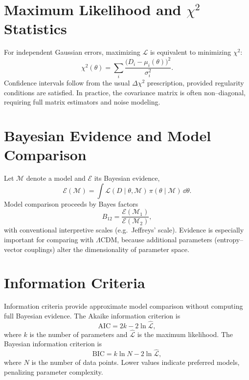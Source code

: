 \section{Maximum Likelihood and $\chi^2$ Statistics}

For independent Gaussian errors, maximizing $\mathcal L$ is equivalent
to minimizing $\chi^2$:
\begin{equation}
\chi^2(\theta) = \sum_i \frac{\bigl(D_i -
\mu_i(\theta)\bigr)^2}{\sigma_i^2}.
\end{equation}
Confidence intervals follow from the usual $\Delta\chi^2$ prescription,
provided regularity conditions are satisfied.  In practice, the
covariance matrix is often non--diagonal, requiring full matrix
estimators and noise modeling.

\section{Bayesian Evidence and Model Comparison}

Let $\mathcal M$ denote a model and $\mathcal E$ its Bayesian evidence,
\begin{equation}
\mathcal E(\mathcal M) =
\int \mathcal L(D\mid \theta,\mathcal M)\,\pi(\theta\mid\mathcal M)\,
\dd\theta.
\end{equation}
Model comparison proceeds by Bayes factors
\begin{equation}
B_{12} = \frac{\mathcal E(\mathcal M_1)}{\mathcal E(\mathcal M_2)},
\end{equation}
with conventional interpretive scales (e.g.\ Jeffreys’ scale).  Evidence
is especially important for comparing \rsvpabbr{} with $\Lambda$CDM,
because additional parameters (entropy--vector couplings) alter the
dimensionality of parameter space.

\section{Information Criteria}

Information criteria provide approximate model comparison without
computing full Bayesian evidence.  The Akaike information criterion is
\begin{equation}
\mathrm{AIC}=2k-2\ln\hat{\mathcal L},
\end{equation}
where $k$ is the number of parameters and $\hat{\mathcal L}$ is the
maximum likelihood.  The Bayesian information criterion is
\begin{equation}
\mathrm{BIC}=k\ln N - 2\ln\hat{\mathcal L},
\end{equation}
where $N$ is the number of data points.  Lower values indicate
preferred models, penalizing parameter complexity.

